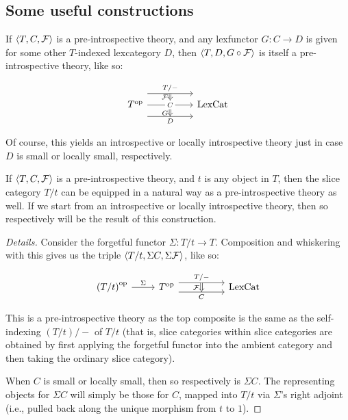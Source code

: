 \subsection{Some useful constructions}
\begin{construction}\label{IntrospInternalMap}
If $\langle T, C, \mathcal{F} \rangle$ is a pre-introspective theory, and any lexfunctor $G : C \to D$ is given for some other $T$-indexed lexcategory $D$, then $\langle T, D, G \circ \mathcal{F} \rangle$ is itself a pre-introspective theory, like so: 

\[\begin{tikzcd}
	{\op{T}} && {\LexCat}
	\arrow["{T/-}"{name=0}, from=1-1, to=1-3, shift left=5]
	\arrow["{C}"{name=1, description}, from=1-1, to=1-3]
	\arrow["{D}"{name=2, swap}, from=1-1, to=1-3, shift right=5]
	\arrow[Rightarrow, "{\introF}"', from=0, to=1]
	\arrow[Rightarrow, "{G}"', from=1, to=2]
\end{tikzcd}\]

Of course, this yields an introspective or locally introspective theory just in case $D$ is small or locally small, respectively.
\end{construction}

\begin{construction}\label{IntrospSlice}
If $\langle T, C, \mathcal{F} \rangle$ is a pre-introspective theory, and $t$ is any object in $T$, then the slice category $T/t$ can be equipped in a natural way as a pre-introspective theory as well. If we start from an introspective or locally introspective theory, then so respectively will be the result of this construction.
\end{construction}
\begin{proof}[Details]
Consider the forgetful functor $\Sigma : T/t \to T$. Composition and whiskering with this gives us the triple $\langle T/t, \Sigma C, \Sigma \mathcal{F} \rangle$, like so:

\[\begin{tikzcd}
	{\op{\left(T/t\right)}} & {\op{T}} && {\LexCat}
	\arrow["{T/-}"{name=0}, from=1-2, to=1-4, shift left=2]
	\arrow["{C}"{name=1, swap}, from=1-2, to=1-4, shift right=2]
	\arrow["{\Sigma}", from=1-1, to=1-2]
	\arrow[Rightarrow, "{\introF}"', from=0, to=1]
\end{tikzcd}\]

This is a pre-introspective theory as the top composite is the same as the self-indexing $(T/t)/-$ of $T/t$ (that is, slice categories within slice categories are obtained by first applying the forgetful functor into the ambient category and then taking the ordinary slice category).

When $C$ is small or locally small, then so respectively is $\Sigma C$. The representing objects for $\Sigma C$ will simply be those for $C$, mapped into $T/t$ via $\Sigma$'s right adjoint (i.e., pulled back along the unique morphism from $t$ to $1$).
\end{proof}


